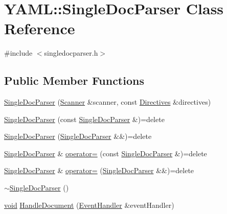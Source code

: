\hypertarget{class_y_a_m_l_1_1_single_doc_parser}{}\section{Y\+A\+ML\+::Single\+Doc\+Parser Class Reference}
\label{class_y_a_m_l_1_1_single_doc_parser}


{\ttfamily \#include $<$singledocparser.\+h$>$}

\subsection*{Public Member Functions}
\begin{DoxyCompactItemize}
\item 
\mbox{\hyperlink{class_y_a_m_l_1_1_single_doc_parser_a114cc1fd77d12561496de09e742958dc}{Single\+Doc\+Parser}} (\mbox{\hyperlink{class_y_a_m_l_1_1_scanner}{Scanner}} \&scanner, const \mbox{\hyperlink{struct_y_a_m_l_1_1_directives}{Directives}} \&directives)
\item 
\mbox{\hyperlink{class_y_a_m_l_1_1_single_doc_parser_ab4ff96c5ae000df0bfa1eae72cdfc6e9}{Single\+Doc\+Parser}} (const \mbox{\hyperlink{class_y_a_m_l_1_1_single_doc_parser}{Single\+Doc\+Parser}} \&)=delete
\item 
\mbox{\hyperlink{class_y_a_m_l_1_1_single_doc_parser_a0076f4801ccdf57b97a56d238c33ce46}{Single\+Doc\+Parser}} (\mbox{\hyperlink{class_y_a_m_l_1_1_single_doc_parser}{Single\+Doc\+Parser}} \&\&)=delete
\item 
\mbox{\hyperlink{class_y_a_m_l_1_1_single_doc_parser}{Single\+Doc\+Parser}} \& \mbox{\hyperlink{class_y_a_m_l_1_1_single_doc_parser_a74478f9f1156fd5ef1ce2db63387cb45}{operator=}} (const \mbox{\hyperlink{class_y_a_m_l_1_1_single_doc_parser}{Single\+Doc\+Parser}} \&)=delete
\item 
\mbox{\hyperlink{class_y_a_m_l_1_1_single_doc_parser}{Single\+Doc\+Parser}} \& \mbox{\hyperlink{class_y_a_m_l_1_1_single_doc_parser_aabbc063f47534f963a5c708ce4a667cf}{operator=}} (\mbox{\hyperlink{class_y_a_m_l_1_1_single_doc_parser}{Single\+Doc\+Parser}} \&\&)=delete
\item 
\mbox{\hyperlink{class_y_a_m_l_1_1_single_doc_parser_a3cb841ba024f59aee663aa3e260c4ed4}{$\sim$\+Single\+Doc\+Parser}} ()
\item 
\mbox{\hyperlink{glad_8h_a950fc91edb4504f62f1c577bf4727c29}{void}} \mbox{\hyperlink{class_y_a_m_l_1_1_single_doc_parser_a7f5d60caf212161d978be553e803d615}{Handle\+Document}} (\mbox{\hyperlink{class_y_a_m_l_1_1_event_handler}{Event\+Handler}} \&event\+Handler)
\end{DoxyCompactItemize}


